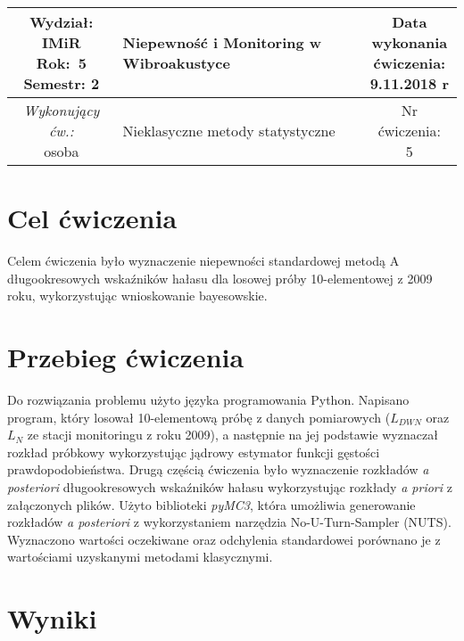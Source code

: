 \documentclass[polish,a4paper,11pt]{mwart}
\let\Oldsection\section
\renewcommand{\section}{\FloatBarrier\Oldsection}
\begin{document}
\begin{table}[h] %
  \centering
  \begin{tabular}{ | c |  >{\centering\arraybackslash}m{5.5cm} | c | }
    \hline
    \makecell{ \textbf{Wydział:} \\ IMiR \\ \textbf{Rok:}~5 \\ Semestr: 2 } &
    \textbf{\large{Niepewność i Monitoring w Wibroakustyce}} &
    \makecell{Data \\ wykonania \\ ćwiczenia: \\ 9.11.2018 r} \\ \hline
    \makecell{\emph{Wykonujący ćw.:} \\ osoba } &
    \large{Nieklasyczne metody statystyczne} &
    \makecell{Nr ćwiczenia: \\ 5} \\ \hline
  \end{tabular}
\end{table}

\section{Cel ćwiczenia}
Celem ćwiczenia było wyznaczenie niepewności standardowej metodą A
długookresowych wskaźników hałasu dla losowej próby 10-elementowej z 2009
roku, wykorzystując wnioskowanie bayesowskie.

\section{Przebieg ćwiczenia}
Do rozwiązania problemu użyto języka programowania Python. Napisano
program, który losował 10-elementową próbę z danych pomiarowych ($L_{DWN}$
oraz $L_N$ ze stacji monitoringu z roku 2009), a następnie na jej podstawie
wyznaczał rozkład próbkowy wykorzystując jądrowy estymator funkcji gęstości
prawdopodobieństwa. 
Drugą częścią ćwiczenia było wyznaczenie rozkładów \textit{a posteriori}
długookresowych wskaźników hałasu wykorzystując rozkłady \textit{a priori}
z załączonych plików. Użyto biblioteki \textit{pyMC3}, która umożliwia
generowanie rozkładów \textit{a posteriori} z wykorzystaniem narzędzia
No-U-Turn-Sampler (NUTS). Wyznaczono wartości oczekiwane oraz odchylenia
standardowei porównano je z wartościami uzyskanymi metodami klasycznymi.

\section{Wyniki}
\end{document}
